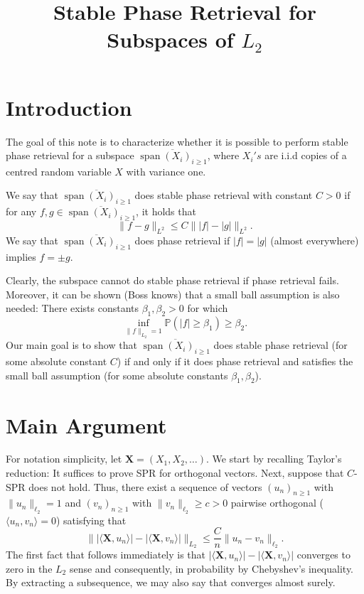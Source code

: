\documentclass[a4paper,12pt]{amsart}
\title{Stable Phase Retrieval for Subspaces of $L_2$}
\numberwithin{equation}{section}
\newcommand{\X}{\mathbf X}
\DeclareMathOperator{\spn}{span}
\begin{document}
\author{}
\maketitle
\section{Introduction}
The goal of this note is to characterize whether it is possible to perform stable phase retrieval for a subspace $\overline{\spn (X_i)_{i\ge 1}}$, where $X_i's$ are i.i.d copies of a centred random variable $X$ with variance one. 

We say that $\overline{\spn (X_i)_{i\ge 1}}$ does stable phase retrieval with constant $C>0$ if for any $f,g \in \overline{\spn (X_i)_{i\ge 1}}$, it holds that
\begin{equation*}
    \| f-g \|_{L^2} \le C \| |f|- |g| \|_{L^2}.
\end{equation*}
We say that $\overline{\spn (X_i)_{i\ge 1}}$ does phase retrieval if $|f|=|g|$ (almost everywhere) implies $f=\pm g$. 

Clearly, the subspace cannot do stable phase retrieval if phase retrieval fails. Moreover, it can be shown (Boss knows) that a small ball assumption is also needed: There exists constants $\beta_1,\beta_2>0$ for which
\begin{equation*}
   \inf_{\|f\|_{L_2}=1} \mathbb{P}(|f|\ge \beta_1) \ge \beta_2.
\end{equation*}
Our main goal is to show that $\overline{\spn (X_i)_{i\ge 1}}$ does stable phase retrieval (for some absolute constant $C$) if and only if it does phase retrieval and satisfies the small ball assumption (for some absolute constants $\beta_1,\beta_2$).

\section{Main Argument}
For notation simplicity, let $\X=(X_1, X_2,\ldots)$. We start by recalling Taylor's reduction: It suffices to prove SPR for orthogonal vectors. Next, suppose that $C$-SPR does not hold. Thus, there exist a sequence of vectors $(u_n)_{n\ge 1}$ with $\|u_n\|_{\ell_2}=1$ and $(v_n)_{n\ge 1}$ with $\|v_n\|_{\ell_2}\ge c>0$ pairwise orthogonal ($\langle u_n,v_n\rangle =0$) satisfying that 
\begin{equation*}
    \| | \langle \X, u_n \rangle| - | \langle \X, v_n \rangle| \|_{L_2} \le \frac{C}{n} \|u_n-v_n\|_{\ell_2}.
\end{equation*}
The first fact that follows immediately is that $| \langle \X, u_n \rangle| - | \langle \X, v_n \rangle|$ converges to zero in the $L_2$ sense and consequently, in probability by Chebyshev's inequality. By extracting a subsequence, we may also say that converges almost surely.
\end{document}
